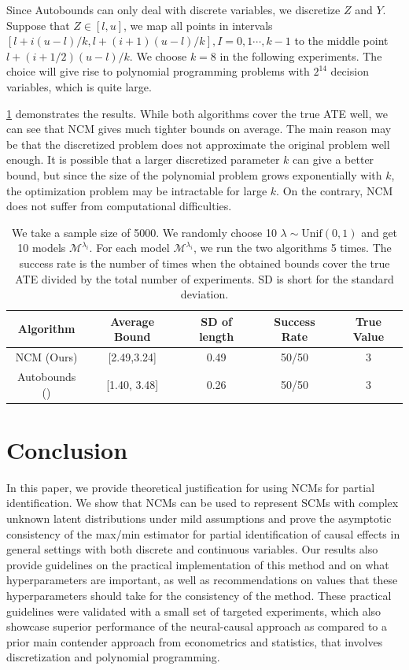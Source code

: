 \documentclass[12pt]{article}
\theoremstyle{plain}
\theoremstyle{definition}
\theoremstyle{remark}
\begin{document}
Since Autobounds can only deal with discrete variables, we discretize $Z$ and $Y$. Suppose that $Z \in [l,u]$, we map all points in intervals $[l+i(u-l)/k,l+(i+1)(u-l)/k], I = 0,1\cdots,k-1 $ to the middle point $l+(i+1/2)(u-l)/k$. We choose $k = 8$ in the following experiments. The choice will give rise to polynomial programming problems with $ 2^{14}$ decision variables, which is quite large.\par 
\cref{table:continuous_iv} demonstrates the results. While both algorithms cover the true ATE well, we can see that NCM gives much tighter bounds on average. The main reason may be that the discretized problem does not approximate the original problem well enough. It is possible that a larger discretized parameter $k$ can give a better bound, but since the size of the polynomial problem grows exponentially with $k$, the optimization problem may be intractable for large $k$. On the contrary, NCM does not suffer from computational difficulties. 
\begin{table}[!htb]
\centering
\begin{tabular}{|c|c|c|c|c|}
\hline
Algorithm & Average Bound & SD of length  & Success Rate & True Value\\
\hline 
NCM (Ours)  & [2.49,3.24] & 0.49 & 50/50 & 3\\
\hline 
Autobounds (\cite{duarteAutomatedApproachCausal2021}) & [1.40, 3.48]& 0.26 & 50/50 & 3 \\
\hline
\end{tabular}
\caption{We take a sample size of 5000. We randomly choose 10 $\lambda \sim \text{Unif}(0,1)$ and get 10 models $\mathcal{M}^{\lambda_i}$. For each model $\mathcal{M}^{\lambda_i}$, we run the two algorithms 5 times. The success rate is the number of times when the obtained bounds cover the true ATE divided by the total number of experiments.  SD is short for the standard deviation.}
\label{table:continuous_iv}
\end{table}


\section{Conclusion}
In this paper, we provide theoretical justification for using NCMs for partial identification. We show that NCMs can be used to represent SCMs with complex unknown latent distributions under mild assumptions and prove the asymptotic consistency of the max/min estimator for partial identification of causal effects in general settings with both discrete and continuous variables. Our results also provide guidelines on the practical implementation of this method and on what hyperparameters are important, as well as recommendations on values that these hyperparameters should take for the consistency of the method. These practical guidelines were validated with a small set of targeted experiments, which also showcase superior performance of the neural-causal approach as compared to a prior main contender approach from econometrics and statistics, that involves discretization and polynomial programming.
\end{document}
